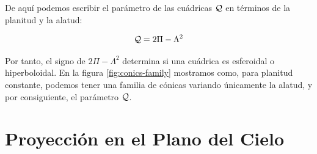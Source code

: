 De aquí podemos escribir el parámetro de las cuádricas $\mathcal{Q}$ en términos de la planitud y la alatud:

\begin{align}
  \mathcal{Q} = 2\Pi - \Lambda^2 \label{eq:quadric-parameter-pi-lambda}
\end{align}

Por tanto, el signo de $2\Pi - \Lambda^2$ determina si una cuádrica es esferoidal o hiperboloidal. En la figura \ref{fig:conics-family} mostramos como, para planitud constante, podemos tener una familia de cónicas variando únicamente la alatud, y por consiguiente, el parámetro $\mathcal{Q}$.

\section{Proyección en el Plano del Cielo}
\label{sec:projection}

